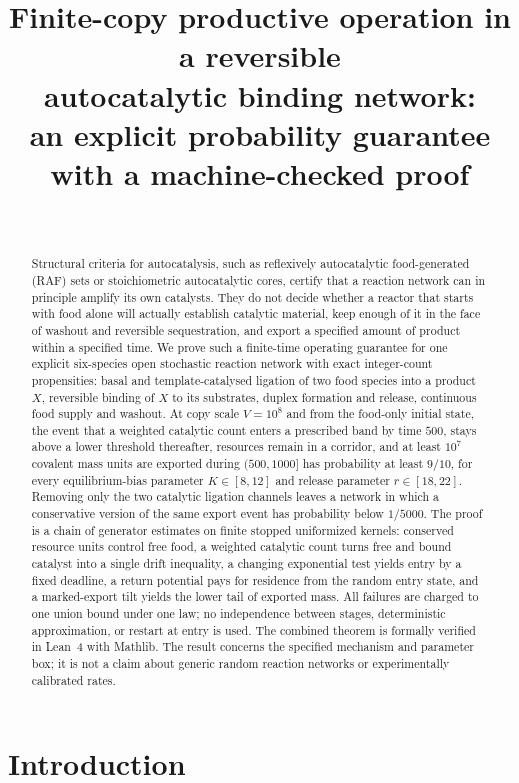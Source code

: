 \documentclass[11pt,a4paper]{article}
\title{Finite-copy productive operation in a reversible\\ autocatalytic binding network:\\[4pt]
\large an explicit probability guarantee with a machine-checked proof}
\author{\PaperAuthor\\ \small \PaperAffiliation}
\date{\PaperDate}
\theoremstyle{plain}
\theoremstyle{definition}
\theoremstyle{remark}
\begin{document}
\maketitle

\begin{abstract}
Structural criteria for autocatalysis, such as reflexively autocatalytic food-generated (RAF) sets or stoichiometric autocatalytic cores, certify that a reaction network can in principle amplify its own catalysts. They do not decide whether a reactor that starts with food alone will actually establish catalytic material, keep enough of it in the face of washout and reversible sequestration, and export a specified amount of product within a specified time. We prove such a finite-time operating guarantee for one explicit six-species open stochastic reaction network with exact integer-count propensities: basal and template-catalysed ligation of two food species into a product $X$, reversible binding of $X$ to its substrates, duplex formation and release, continuous food supply and washout. At copy scale $V=10^8$ and from the food-only initial state, the event that a weighted catalytic count enters a prescribed band by time $500$, stays above a lower threshold thereafter, resources remain in a corridor, and at least $10^7$ covalent mass units are exported during $(500,1000]$ has probability at least $9/10$, for every equilibrium-bias parameter $K\in[8,12]$ and release parameter $r\in[18,22]$. Removing only the two catalytic ligation channels leaves a network in which a conservative version of the same export event has probability below $1/5000$. The proof is a chain of generator estimates on finite stopped uniformized kernels: conserved resource units control free food, a weighted catalytic count turns free and bound catalyst into a single drift inequality, a changing exponential test yields entry by a fixed deadline, a return potential pays for residence from the random entry state, and a marked-export tilt yields the lower tail of exported mass. All failures are charged to one union bound under one law; no independence between stages, deterministic approximation, or restart at entry is used. The combined theorem is formally verified in Lean~4 with Mathlib. The result concerns the specified mechanism and parameter box; it is not a claim about generic random reaction networks or experimentally calibrated rates.
\end{abstract}

\section{Introduction}\label{sec:intro}
\end{document}
